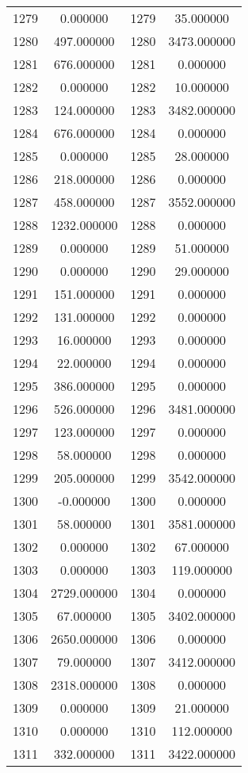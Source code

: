\documentclass[12pt]{article}
\begin{document}
\begin{longtable}{@{}cccc@{}}
1279 & 0.000000 & 1279 & 35.000000 \\
1280 & 497.000000 & 1280 & 3473.000000 \\
1281 & 676.000000 & 1281 & 0.000000 \\
1282 & 0.000000 & 1282 & 10.000000 \\
1283 & 124.000000 & 1283 & 3482.000000 \\
1284 & 676.000000 & 1284 & 0.000000 \\
1285 & 0.000000 & 1285 & 28.000000 \\
1286 & 218.000000 & 1286 & 0.000000 \\
1287 & 458.000000 & 1287 & 3552.000000 \\
1288 & 1232.000000 & 1288 & 0.000000 \\
1289 & 0.000000 & 1289 & 51.000000 \\
1290 & 0.000000 & 1290 & 29.000000 \\
1291 & 151.000000 & 1291 & 0.000000 \\
1292 & 131.000000 & 1292 & 0.000000 \\
1293 & 16.000000 & 1293 & 0.000000 \\
1294 & 22.000000 & 1294 & 0.000000 \\
1295 & 386.000000 & 1295 & 0.000000 \\
1296 & 526.000000 & 1296 & 3481.000000 \\
1297 & 123.000000 & 1297 & 0.000000 \\
1298 & 58.000000 & 1298 & 0.000000 \\
1299 & 205.000000 & 1299 & 3542.000000 \\
1300 & -0.000000 & 1300 & 0.000000 \\
1301 & 58.000000 & 1301 & 3581.000000 \\
1302 & 0.000000 & 1302 & 67.000000 \\
1303 & 0.000000 & 1303 & 119.000000 \\
1304 & 2729.000000 & 1304 & 0.000000 \\
1305 & 67.000000 & 1305 & 3402.000000 \\
1306 & 2650.000000 & 1306 & 0.000000 \\
1307 & 79.000000 & 1307 & 3412.000000 \\
1308 & 2318.000000 & 1308 & 0.000000 \\
1309 & 0.000000 & 1309 & 21.000000 \\
1310 & 0.000000 & 1310 & 112.000000 \\
1311 & 332.000000 & 1311 & 3422.000000 \\

\end{longtable}
\end{document}
